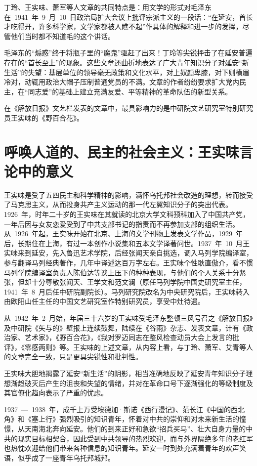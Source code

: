 丁玲、王实味、萧军等人文章的共同特点是：用文学的形式对毛泽东在~1941~年~9~月~10~日政治局扩大会议上批评宗派主义的一段话：“在延安，首长才吃得开，许多科学家，文学家都被人瞧不起”作具体的解释和进一步的发挥，尽管他们当时都不知道毛的这个讲话。

毛泽东的“煽惑”终于将瓶子里的“魔鬼”驱赶了出来！丁玲等尖锐抨击了在延安普遍存在的“首长至上”的现象。这些文章还曲折地表达了广大青年知识分子对延安“新生活”的失望：基层单位的领导毫无政策和文化水平，对上奴颜卑膝，对下则横眉冷对，动辄用政治大帽子压制普通党员的不满。文章的作者纷纷要求扩大党内民主，在“同志爱”的基础上建立充满友爱、平等精神的革命队伍的新型关系。

在《解放日报》文艺栏发表的文章中，最具影响力的是中研院文艺研究室特别研究员王实味的《野百合花》。

\section{呼唤人道的、民主的社会主义：王实味言论中的意义}

王实味是受了五四民主和科学精神的影响，满怀乌托邦社会改造的理想，转而接受了马克思主义，从而投身共产主义运动的那一代左翼知识分子的突出代表。1926~年，时年二十岁的王实味在其就读的北京大学文科预科加入了中国共产党，一年后因与女友恋爱受到了中共支部书记的指责而不再参加支部的组织生活。从~1926~年起，王实味开始在北京、上海的文学刊物上发表文学作品，1929~年后，长期住在上海，有过一本创作小说集和五本文学译著问世。1937~年~10~月王实味来到延安，先入鲁迅艺术学院，后经张闻天亲自挑选，调入马列学院编译室，参与翻译马列经典著作，几年中译述达百万字左右。王实味个性耿直傲介，看不惯马列学院编译室负责人陈伯达等谀上压下的种种表现，与他们的个人关系十分紧张，但却十分尊敬张闻天、王学文和范文澜（原任马列学院中国史研究室主任，1941~年~8~月后任中研院副院长）。马列研究院改名为中央研究院后，王实味转入由欧阳山任主任的中国文艺研究室作特别研究员，享受中灶待遇。

从~1942~年~2~月始，年届三十六岁的王实味受毛泽东整顿三风号召之《解放日报》及中研院《矢与的》壁报上连续鼓舞，陆续在《谷雨》杂志、发表文章，计有《政治家、艺术家》，《野百合花》，《我对罗迈同志在整风检查动员大会上发言的批评》，《零感两则》等。王实味的上述文章，从内容上看，与丁玲、萧军、艾青等人的文章完全一致，只是更具尖锐性和批判性。

王实味大胆地揭露了延安“新生活”的阴影，相当准确地反映了延安青年知识分子理想渐趋破灭后产生的沮丧和失望的情绪，并对在革命口号下逐渐强化的等级制度及其官僚化趋向表示了严重的忧虑。

1937~—~1938~年，成千上万受埃德加·斯诺《西行漫记》、范长江《中国的西北角》和《塞上行》强烈吸引的知识青年，怀着对中共的崇仰和对未来新生活的憧憬，从天南海北奔向延安。他们的到来正好和急欲“招兵买马”、壮大自身力量的中共的现实目标相契合，因此受到中共领导的热烈欢迎，而与外界隔绝多年的老红军也热忱欢迎给他们带来各种信息的知识青年。延安一时到处充满着青年的欢声笑语，似乎成了一座青年乌托邦城邦。

